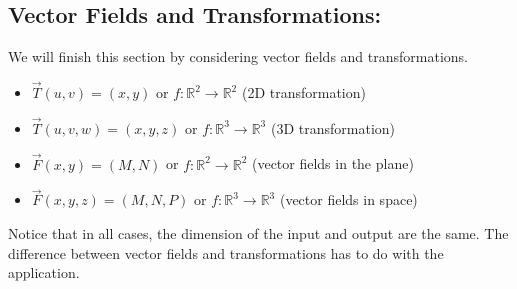 \documentclass[10pt,]{book}
\theoremstyle{plain}
\theoremstyle{definition}
\theoremstyle{definition}
\theoremstyle{definition}
\theoremstyle{definition}
\theoremstyle{definition}
\numberwithin{equation}{section}
\begin{document}
\typeout{************************************************}
\typeout{************************************************}
\subsection[{Vector Fields and Transformations:}]{Vector Fields and Transformations:}\label{subsection-28}
We will finish this section by considering vector fields and transformations. \leavevmode%
\begin{itemize}[label=\textbullet]
\item{}\(\vec T(u,v)=(x,y)\) or \(f\colon \mathbb{R}^2\to\mathbb{R}^2\) (2D transformation)%
\item{}\(\vec T(u,v,w)=(x,y,z)\) or \(f\colon \mathbb{R}^3\to\mathbb{R}^3\) (3D transformation)%
\item{}\(\vec F(x,y)=(M,N)\) or \(f\colon \mathbb{R}^2\to\mathbb{R}^2\) (vector fields in the plane)%
\item{}\(\vec F(x,y,z)=(M,N,P)\) or \(f\colon \mathbb{R}^3\to\mathbb{R}^3\) (vector fields in space)%
\end{itemize}
%
\par
Notice that in all cases, the dimension of the input and output are the same. The difference between vector fields and transformations has to do with the application.%
\typeout{************************************************}
\typeout{************************************************}
\end{document}
